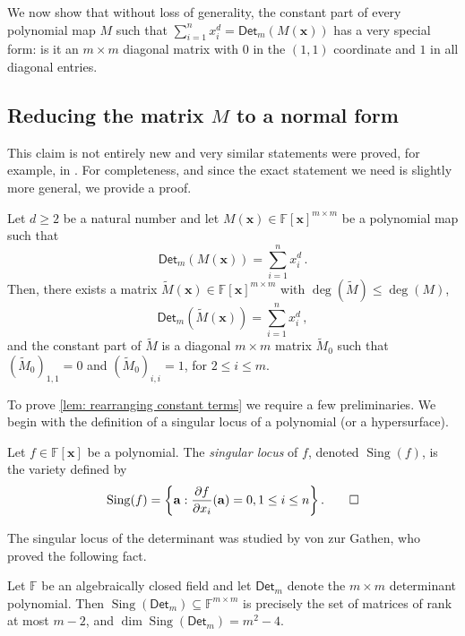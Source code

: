 \documentclass[10pt,a4paper]{article}
\newcommand{\F}{\mathbb{F}}
\newcommand{\va}{\mathbf{a}}
\newcommand{\vx}{\mathbf{x}}
\newcommand{\Det}{\mathsf{Det}}
\DeclareMathOperator{\Sing}{Sing}
\newcommand{\set}[1]{\left\{ #1 \right\}}
\begin{document}
We now show that without loss of generality, the constant part of every polynomial map $M$ such that $\sum_{i=1}^n x_i^d = \Det_m(M(\vx))$ has a very special form: is it an $m \times m$ diagonal matrix with $0$ in the $(1,1)$ coordinate and $1$ in all diagonal entries.

\subsection{Reducing the matrix \texorpdfstring{$M$}{M} to a normal form}\label{sec: redn to normal form}

This claim is not entirely new and very similar statements were proved, for example, in \cite{MR04, ABV17}. For completeness, and since the exact statement we need is slightly more general, we provide a proof.

\begin{lemma}\label{lem: rearranging constant terms}
Let $d \ge 2$ be a natural number and let $M(\vx) \in \F[\vx]^{m \times m}$ be a polynomial map such that 
\[
\Det_m(M(\vx)) = \sum_{i = 1}^n x_i^d \, .
\]
Then, there exists a matrix $\tilde{M}(\vx)\in \F[\vx]^{m \times m}$ with $\deg(\tilde{M}) \leq \deg(M)$, 
\[
\Det_m(\tilde{M}(\vx)) = \sum_{i = 1}^n x_i^d \, ,
\]
and the constant part of $\tilde{M}$ is a diagonal $m \times m$ matrix $\tilde{M}_0$ such that $(\tilde{M}_0)_{1,1}=0$ and $(\tilde{M}_0)_{i,i}=1$, for $2 \le i \le m$.
\end{lemma}

To prove \autoref{lem: rearranging constant terms} we require a few preliminaries. We begin with the definition of a singular locus of a polynomial (or a hypersurface).

\begin{definition}\label{def:singular locus}
Let $f \in \F[\vx]$ be a polynomial. The \emph{singular locus} of $f$, denoted $\Sing(f)$, is the variety defined by
\[
\Sing(f) = \set{\va : \frac{\partial f }{\partial x_i} (\va) = 0, 1 \le i \le n}. \qedhere
\]
\end{definition}

The singular locus of the determinant was studied by von zur Gathen, who proved the following fact.

\begin{fact}\label{fact:singular locus of det}
Let $\F$ be an algebraically closed field and let $\Det_m $ denote the $m \times m$ determinant polynomial. Then $\Sing(\Det_m) \subseteq \F^{m \times m}$ is precisely the set of matrices of rank at most $m-2$, and $\dim \Sing(\Det_m) = m^2 - 4$.
\end{fact}
\end{document}

